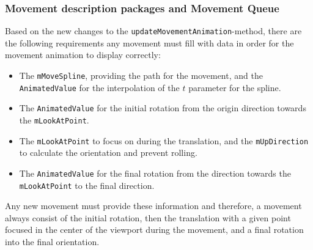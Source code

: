 \subsubsection{Movement description packages and Movement Queue}\label{subsubsec:movement-description-packages-and-movement-queue}

Based on the new changes to the \texttt{updateMovementAnimation}-method, there are the following requirements any
movement must fill with data in order for the movement animation to display correctly:
\begin{itemize}
    \item The \texttt{mMoveSpline}, providing the path for the movement, and the \texttt{AnimatedValue}
    for the interpolation of the $t$ parameter for the spline.
    \item The \texttt{AnimatedValue} for the initial rotation from the origin direction towards the
    \texttt{mLookAtPoint}.
    \item The \texttt{mLookAtPoint} to focus on during the translation, and the \texttt{mUpDirection}
    to calculate the orientation and prevent rolling.
    \item The \texttt{AnimatedValue} for the final rotation from the direction towards the
    \texttt{mLookAtPoint} to the final direction.
\end{itemize}
Any new movement must provide these information and therefore, a movement always consist of the initial rotation,
then the translation with a given point focused in the center of the viewport during the movement, and a final
rotation into the final orientation.

